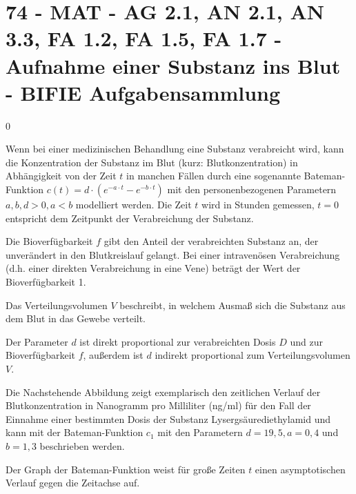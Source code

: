 \section{74 - MAT - AG 2.1, AN 2.1, AN 3.3, FA 1.2, FA 1.5, FA 1.7 - Aufnahme einer Substanz ins Blut - BIFIE Aufgabensammlung}

\begin{langesbeispiel} \item[0] %
	
Wenn bei einer medizinischen Behandlung eine Substanz verabreicht wird, kann die Konzentration der Substanz im Blut (kurz: Blutkonzentration) in Abhängigkeit von der Zeit $t$ in manchen Fällen durch eine sogenannte Bateman-Funktion $c(t)=d\cdot(e^{-a\cdot t}-e^{-b\cdot t})$ mit den personenbezogenen Parametern $a,b,d>0, a<b$ modelliert werden. Die Zeit $t$ wird in Stunden gemessen, $t=0$ entspricht dem Zeitpunkt der Verabreichung der Substanz.\leer

Die Bioverfügbarkeit $f$ gibt den Anteil der verabreichten Substanz an, der unverändert in den Blutkreislauf gelangt. Bei einer intravenösen Verabreichung (d.h. einer direkten Verabreichung in eine Vene) beträgt der Wert der Bioverfügbarkeit 1.\leer

Das Verteilungsvolumen $V$ beschreibt, in welchem Ausmaß sich die Substanz aus dem Blut in das Gewebe verteilt.\leer

Der Parameter $d$ ist direkt proportional zur verabreichten Dosis $D$ und zur Bioverfügbarkeit $f$, außerdem ist $d$ indirekt proportional zum Verteilungsvolumen $V$.\leer

Die Nachstehende Abbildung zeigt exemplarisch den zeitlichen Verlauf der Blutkonzentration in Nanogramm pro Milliliter (ng/ml) für den Fall der Einnahme einer bestimmten Dosis der Substanz Lysergsäurediethylamid und kann mit der Bateman-Funktion $c_1$ mit den Parametern $d=19,5, a=0,4$ und $b=1,3$ beschrieben werden.\leer

Der Graph der Bateman-Funktion weist für große Zeiten $t$ einen asymptotischen Verlauf gegen die Zeitachse auf.


\end{langesbeispiel}
